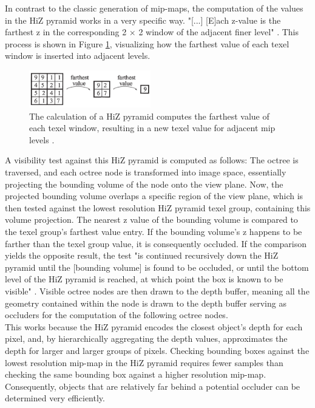 \noindent
In contrast to the classic generation of mip-maps, the computation of the values in the \ac{HiZ} pyramid works in a 
very specific way. "[...] [E]ach z-value is the farthest z in the corresponding 2 \begin{math}\times\end{math} 2 window 
of the adjacent finer level" \cite{AkenineMoeller2018}. This process is shown in Figure \ref{fig:hiz-value-computation}, 
visualizing how the farthest value of each texel window is inserted into adjacent levels.\\
\enlargethispage{\baselineskip}

\begin{figure}[h]
    \centering
    \includegraphics[width=200px]{images/graphics/hiz-buf-values.jpg}
    \caption{The calculation of a \ac{HiZ} pyramid computes the farthest value of each texel window, 
    resulting in a new texel value for adjacent mip levels \cite{AkenineMoeller2018}.}
    \label{fig:hiz-value-computation}
\end{figure}

\noindent
A visibility test against this \ac{HiZ} pyramid is computed as follows: The octree is traversed, and each octree node 
is transformed into image space, essentially projecting the bounding volume of the node onto the view plane. Now, 
the projected bounding volume overlaps a specific region of the view plane, which is then tested against the lowest 
resolution \ac{HiZ} pyramid texel group, containing this volume projection. The nearest z value of the bounding volume is 
compared to the texel group's farthest value entry. If the bounding volume's z happens to be farther than the 
texel group value, it is consequently occluded. If the comparison yields the opposite result, the test "is continued 
recursively down the \ac{HiZ} pyramid until the [bounding volume] is found to be occluded, or until the bottom level of the 
\ac{HiZ} pyramid is reached, at which point the box is known to be visible" \cite{AkenineMoeller2018}. Visible octree nodes 
are then drawn to the depth buffer, meaning all the geometry contained within the node is drawn to the depth buffer 
serving as occluders for the computation of the following octree nodes.\\

\noindent
This works because the \ac{HiZ} pyramid encodes the closest object's depth for each pixel, and, by hierarchically 
aggregating the depth values, approximates the depth for larger and larger groups of pixels. Checking bounding boxes 
against the lowest resolution mip-map in the \ac{HiZ} pyramid requires fewer samples than checking the same bounding 
box against a higher resolution mip-map. Consequently, objects that are relatively far behind a potential occluder 
can be determined very efficiently. \\

